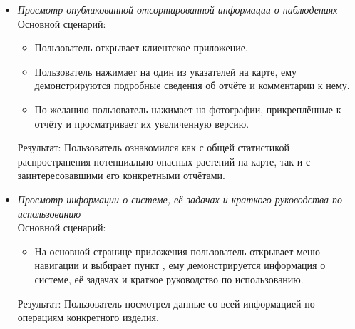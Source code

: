 \begin{itemize}[topsep=0pt, parsep=0pt, itemsep=0pt, leftmargin=*, labelindent=0.5cm]
	\item \textit{Просмотр опубликованной отсортированной информации о наблюдениях} \\
	Основной сценарий:
	\begin{itemize}[topsep=0pt, parsep=0pt, itemsep=0pt, leftmargin=*, labelindent=0.5cm]
		\item Пользователь открывает клиентское приложение.
		\item Пользователь нажимает на один из указателей на карте, ему демонстрируются подробные сведения об отчёте и комментарии к нему.
		\item По желанию пользователь нажимает на фотографии, прикреплённые к отчёту и просматривает их увеличенную версию.
	\end{itemize}
	Результат: Пользователь ознакомился как с общей статистикой распространения потенциально опасных растений на карте, так и с заинтересовавшими его конкретными отчётами.
	
	\item \textit{Просмотр информации о системе, её задачах и краткого руководства по использованию} \\
	Основной сценарий:
	\begin{itemize}[topsep=0pt, parsep=0pt, itemsep=0pt, leftmargin=*, labelindent=0.5cm]
		\item На основной странице приложения пользователь открывает меню навигации и выбирает пункт , ему демонстрируется информация о системе, её задачах и краткое руководство по использованию.
	\end{itemize}
	Результат: Пользователь посмотрел данные со всей информацией по операциям конкретного изделия.
	

\end{itemize}
